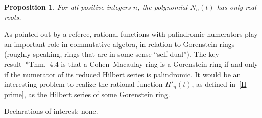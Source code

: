 \documentclass[11pt]{amsart}
\theoremstyle{plain}
\newtheorem{prop}[theorem]{Proposition}
\theoremstyle{definition}
\numberwithin{equation}{section}
\begin{document}
\begin{prop}
    For all positive integers $n$, the polynomial $N_n(t)$ has only real roots.
\end{prop}

As pointed out by a referee, rational functions with palindromic numerators play an important role in commutative algebra, in relation to Gorenstein rings (roughly speaking, rings that are in some sense ``self-dual'').
The key result~\cite{Stanley78}*{Thm.~4.4} is that a Cohen--Macaulay ring is a Gorenstein ring if and only if the numerator of its reduced Hilbert series is palindromic.
It would be an interesting problem to realize the rational function $H'_n(t)$, as defined in~\eqref{H prime}, as the Hilbert series of some Gorenstein ring.




 \bigskip

 \noindent \scriptsize Declarations of interest: none.



\end{document}
